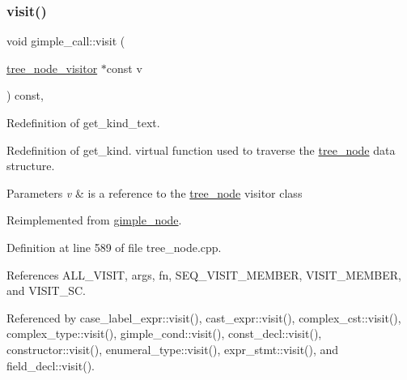 \subsubsection{\texorpdfstring{visit()}{visit()}}
{\footnotesize\ttfamily void gimple\+\_\+call\+::visit (\begin{DoxyParamCaption}\item[{\hyperlink{classtree__node__visitor}{tree\+\_\+node\+\_\+visitor} $\ast$const}]{v }\end{DoxyParamCaption}) const\hspace{0.3cm}{\ttfamily [override]}, {\ttfamily [virtual]}}



Redefinition of get\+\_\+kind\+\_\+text. 

Redefinition of get\+\_\+kind. virtual function used to traverse the \hyperlink{classtree__node}{tree\+\_\+node} data structure. 
\begin{DoxyParams}{Parameters}
{\em v} & is a reference to the \hyperlink{classtree__node}{tree\+\_\+node} visitor class \\
\hline
\end{DoxyParams}


Reimplemented from \hyperlink{structgimple__node_a337b029a3aca9c1b96311b6e6668f7f3}{gimple\+\_\+node}.



Definition at line 589 of file tree\+\_\+node.\+cpp.



References A\+L\+L\+\_\+\+V\+I\+S\+IT, args, fn, S\+E\+Q\+\_\+\+V\+I\+S\+I\+T\+\_\+\+M\+E\+M\+B\+ER, V\+I\+S\+I\+T\+\_\+\+M\+E\+M\+B\+ER, and V\+I\+S\+I\+T\+\_\+\+SC.



Referenced by case\+\_\+label\+\_\+expr\+::visit(), cast\+\_\+expr\+::visit(), complex\+\_\+cst\+::visit(), complex\+\_\+type\+::visit(), gimple\+\_\+cond\+::visit(), const\+\_\+decl\+::visit(), constructor\+::visit(), enumeral\+\_\+type\+::visit(), expr\+\_\+stmt\+::visit(), and field\+\_\+decl\+::visit().

